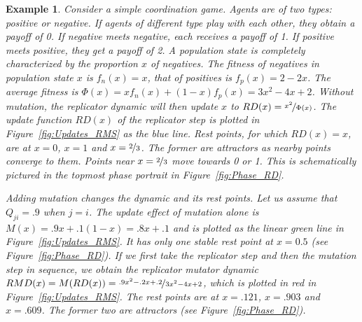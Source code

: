 \documentclass[a4paper, 11pt]{article}
\theoremstyle{Satz}
\newtheorem{example}{Example}
\begin{document}
\begin{example}
  Consider a simple coordination game. Agents are of two types: positive or negative. If
  agents of different type play with each other, they obtain a payoff of 0. If negative meets
  negative, each receives a payoff of 1. If positive meets positive, they get a payoff of 2. A
  population state is completely characterized by the proportion $x$ of negatives. The fitness
  of negatives in population state $x$ is $f_n(x) = x$, that of positives is $f_p(x) = 2-2x$.
  The average fitness is $\Phi(x) = x f_n(x) + (1-x) f_p(x) = 3x^2 - 4x + 2$. Without mutation,
  the replicator dynamic will then update $x$ to $RD(x) = \nicefrac{x^2}{\Phi(x)}$. The update
  function $RD(x)$ of the replicator step is plotted in Figure~\ref{fig:Updates_RMS} as the
  blue line. Rest points, for which $RD(x)=x$, are at $x=0$, $x=1$ and $x= \nicefrac{2}{3}$.
  The former are attractors as nearby points converge to them. Points near $x=\nicefrac{2}{3}$
  move towards 0 or 1. This is schematically pictured in the topmost phase portrait in
  Figure~\ref{fig:Phase_RD}.

  Adding mutation changes the dynamic and its rest points. Let us assume that $Q_{ji} = .9$
  when $j=i$. The update effect of mutation alone is $M(x) = .9 x + .1 (1-x) = .8x + .1$ and is
  plotted as the linear green line in Figure~\ref{fig:Updates_RMS}. It has only one stable rest
  point at $x = 0.5$ (see Figure~\ref{fig:Phase_RD}). If we first take the replicator step and
  then the mutation step in sequence, we obtain the replicator mutator dynamic
  $RMD(x) = M(RD(x)) = \nicefrac{.9x^2 - .2x +.2}{3x^2 - 4x + 2}$, which is plotted in red in
  Figure~\ref{fig:Updates_RMS}. The rest points are at $x=.121$, $x=.903$ and $x=.609$. The
  former two are attractors (see Figure~\ref{fig:Phase_RD}).
\end{example}
\end{document}
